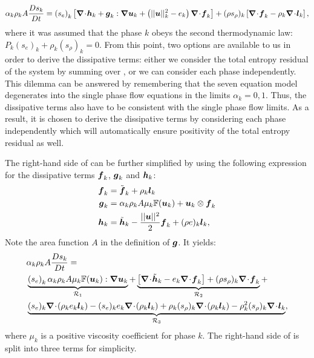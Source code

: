 %
\begin{equation}\label{eq:ent-res-7-eqn-diss-terms}
\alpha_k \rho_k A \frac{Ds_k}{Dt} = \left(s_e\right)_k \left[ \div \mbold h_k + \mbold g_k : \grad \mbold u_k +  \left( || \mbold u ||^2_k - e_k\right) \div \mbold f_k  \right] + (\rho s_\rho)_k \left[ \div \mbold f_k - \rho_k \div \mbold l_k \right],
\end{equation}
%
where it was assumed that the phase $k$ obeys the second thermodynamic law: $P_k (s_e)_k + \rho_k (s_\rho)_k = 0$. 
From this point, two options are available to us in order to derive the dissipative terms: either we consider the total entropy residual of the system by summing over , or we can consider each phase independently. This dilemma can be answered by remembering that the seven equation model degenerates into the single phase flow equations in the limits $\alpha_k = 0,1$. Thus, the dissipative terms also have to be consistent with the single phase flow limits. As a result, it is chosen to derive the dissipative terms by considering each phase independently which will automatically ensure positivity of the total entropy residual as well.

The right-hand side of  can be further simplified by using the following expression
for the dissipative terms $\boldsymbol f_k$,  $\boldsymbol g_k$ and $\boldsymbol h_k$:
\begin{align}\label{eq:def-diss-terms-sect4}
  \boldsymbol f_k &= \tilde{\boldsymbol f}_k + \rho_k \boldsymbol l_k 
  \\
  \boldsymbol g_k &= \alpha_k \rho_k A \mu_k \mathbb{F}(\boldsymbol u_k) + \boldsymbol u_k \otimes \boldsymbol f_k
  \\
  \boldsymbol h_k &= \tilde{\boldsymbol h}_k - \frac{|| \boldsymbol u||^2 }{2} \boldsymbol f_k + (\rho e)_k \boldsymbol l_k,
\end{align}
Note the area function $A$ in the definition of $\boldsymbol g$. It yields:
%
\begin{align}\label{eq:ent-res-7-eqn-diss-terms2}
&\alpha_k \rho_k A \frac{Ds_k}{Dt} = \nonumber \\
&\underbrace{\left(s_e\right)_k \alpha_k \rho_k A \mu_k \mathbb{F}(\mbold u_k) : \grad \mbold u_k}_{\mathcal{R}_1} +
\underbrace{\left[ \div \tilde{\mbold h}_k  - e_k \div \mbold f_k  \right] + (\rho s_\rho)_k \div \mbold f_k}_{\mathcal{R}_2} + \nonumber \\
&\underbrace{(s_e)_k \div \left( \rho_k e_k \mbold l_k \right) -  (s_e)_k e_k \div \left( \rho_k \mbold l_k \right) + \rho_k (s_\rho)_k \div \left( \rho_k \mbold l_k \right) 
  - \rho_k^2 (s_\rho)_k \div \mbold l_k}_{\mathcal{R}_3},
\end{align}
%
where $\mu_k$ is a positive viscosity coefficient for phase $k$. The right-hand side of  is split into three terms for simplicity. \\

